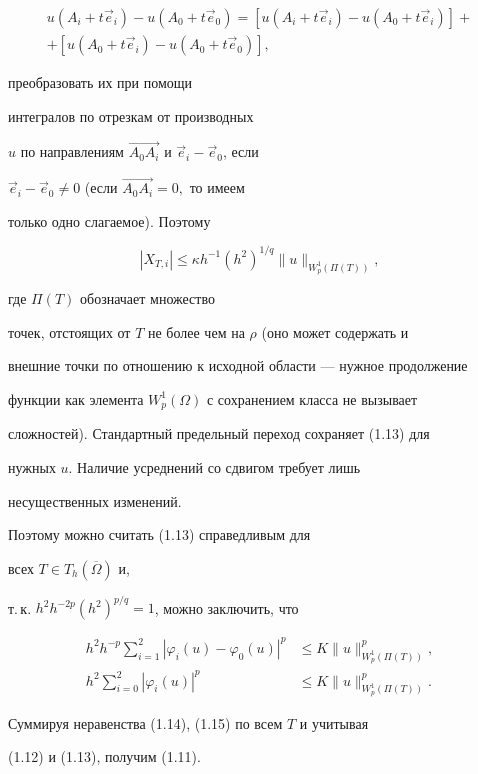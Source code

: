 \begin{pf}
\begin{gather*}
u(A_i+t\Vec e_i)-u(A_0+t\Vec e_0)=[u(A_i+t\Vec e_i)-u(A_0+t\Vec e_i)]+\\


%


+[u(A_0+t\Vec e_i)-u(A_0+t\Vec e_0)],


\end{gather*}


преобразовать их при помощи


интегралов по отрезкам от произ\-водных 


$u$ по направлениям $\overrightarrow {A_0A_i}$ и $\Vec e_i-\Vec e_0$, если


$\Vec e_i-\Vec e_0\ne 0$ (если $\overrightarrow {A_0A_i}=0,$ то имеем


только одно слагаемое). Поэтому


\begin{equation}


|X_{T,i}|\le \kappa h^{-1}(h^{2})^{1/q}


\|u\|_{W_p^1(\Pi(T))},


\end{equation}


где $\Pi(T)$ обозначает множество


 точек, отстоящих от $T$ не более чем на $\rho$ (оно может содержать и


внешние точки по отношению к исходной области --- нужное продолжение


функции как элемента $W_p^1(\Omega)$ с сохранением класса не вызывает


сложностей). Стандарт\-ный предельный переход сохраняет (1.13) для


нужных $u$. Наличие усреднений со сдвигом требует лишь


несущественных изменений.


 Поэтому можно считать (1.13) справедливым для


всех $T\in T_h(\overline\Omega)$ и,


т.\,к. $h^2h^{-2p}(h^2)^{p/q}=1$, можно заключить, что


\begin{align}


h^2h^{-p} \sum_{i=1}^2|\varphi_i(u)-\varphi_0(u)|^p & \le K


\|u\|^p_{W_p^1(\Pi(T))},\\


%


h^2 \sum_{i=0}^2|\varphi_i(u)|^p & \le K


\|u\|^p_{W_p^1(\Pi(T))}.


\end{align}





Суммируя неравенства (1.14), (1.15) по всем $T$ и учитывая


(1.12) и (1.13), получим (1.11).


\end{pf}





